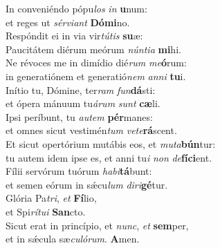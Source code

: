 \oddverse In conveniéndo pópu\textit{los} \textit{in} \textbf{u}num:~\*\\
\oddverse et reges ut \textit{sér}\textit{vi}\textit{ant} \textbf{Dó}\textbf{mi}no.\\
\evenverse Respóndit ei in via vir\textit{tú}\textit{tis} \textbf{su}æ:~\*\\
\evenverse Paucitátem diérum meórum \textit{nún}\textit{ti}\textit{a} \textbf{mi}hi.\\
\oddverse Ne révoces me in dimídio dié\textit{rum} \textit{me}\textbf{ó}rum:~\*\\
\oddverse in generatiónem et generatió\textit{nem} \textit{an}\textit{ni} \textbf{tu}i.\\
\evenverse Inítio tu, Dómine, ter\textit{ram} \textit{fun}\textbf{dá}sti:~\*\\
\evenverse et ópera mánuum tu\textit{á}\textit{rum} \textit{sunt} \textbf{cæ}li.\\
\oddverse Ipsi períbunt, tu \textit{au}\textit{tem} \textbf{pér}manes:~\*\\
\oddverse et omnes sicut vestimén\textit{tum} \textit{ve}\textit{te}\textbf{rá}scent.\\
\evenverse Et sicut opertórium mutábis eos, et \textit{mu}\textit{ta}\textbf{bún}tur:~\*\\
\evenverse tu autem idem ipse es, et anni tu\textit{i} \textit{non} \textit{de}\textbf{fí}\textbf{ci}ent.\\
\oddverse Fílii servórum tuórum \textit{ha}\textit{bi}\textbf{tá}bunt:~\*\\
\oddverse et semen eórum in sǽcu\textit{lum} \textit{di}\textit{ri}\textbf{gé}tur.\\
\evenverse Glória Pa\textit{tri}, \textit{et} \textbf{Fí}lio,~\*\\
\evenverse et Spi\textit{rí}\textit{tu}\textit{i} \textbf{San}cto.\\
\oddverse Sicut erat in princípio, et \textit{nunc}, \textit{et} \textbf{sem}per,~\*\\
\oddverse et in sǽcula sæ\textit{cu}\textit{ló}\textit{rum}. \textbf{A}men.\\
